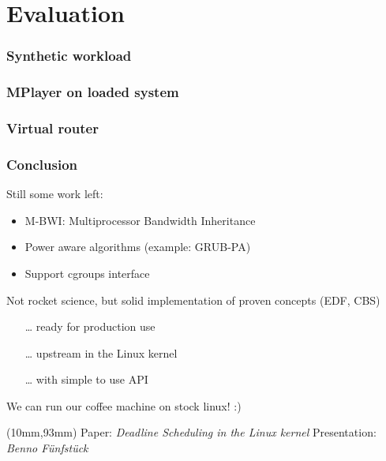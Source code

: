 \documentclass[aspectratio=1610,xcolor=svgnames]{beamer}
\begin{document}
\section{Evaluation}

\begin{frame}\frametitle{Synthetic workload}
\end{frame}

\begin{frame}\frametitle{MPlayer on loaded system}
  \begin{center}
    
  \end{center}
\end{frame}

\begin{frame}\frametitle{Virtual router}
  
\end{frame}

\begin{frame}
  \frametitle{Conclusion} 
    Still some work left:
    \begin{itemize} 
      \item M-BWI: Multiprocessor Bandwidth Inheritance
      \item Power aware algorithms (example: GRUB-PA)
      \item Support cgroups interface
    \end{itemize}

    Not rocket science, but solid implementation of proven concepts (EDF, CBS)
    \begin{itemize}
      \item[\ldots] ready for production use
      \item[\ldots] upstream in the Linux kernel
      \item[\ldots] with simple to use API
    \end{itemize}

    We can run our coffee machine on stock linux! :)
      
  \begin{textblock*}{15cm}(10mm,93mm)
    \footnotesize{Paper: \textit{Deadline Scheduling in the Linux kernel}\hspace{1cm}
      Presentation: \textit{Benno Fünfstück}}
  \end{textblock*}
\end{frame}
\end{document}
